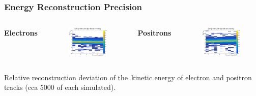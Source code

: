 \documentclass{beamer}
\begin{document}
	\begin{frame}
		\frametitle{Energy Reconstruction Precision}
		\centering
		\begin{columns}
			\centering
			\Large \textbf{Electrons}
			\begin{figure}
				\centering
				\includegraphics[width = 0.95 \linewidth]{../images/h_e_deltaenergy_energy.png}
			\end{figure}
			\centering
			\Large \textbf{Positrons}
			\begin{figure}
				\centering
				\includegraphics[width = 0.95 \linewidth]{../images/h_p_deltaenergy_energy.png}
			\end{figure}
		\end{columns}
		\vspace{0.5cm}
		\footnotesize{Relative reconstruction deviation of the~kinetic energy of electron and positron tracks (cca 5000 of each simulated).}
	\end{frame}
\end{document}
